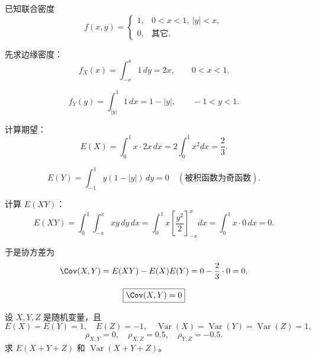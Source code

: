\begin{solution}
已知联合密度
\[
f(x,y)=
\begin{cases}
1, & 0<x<1,\ |y|<x,\\[3pt]
0, & \text{其它}.
\end{cases}
\]

先求边缘密度：
\[
f_X(x)=\int_{-x}^{x}1\,dy=2x,\qquad 0<x<1.
\]

\[
f_Y(y)=\int_{|y|}^{1}1\,dx=1-|y|,\qquad -1<y<1.
\]

计算期望：
\[
E(X)=\int_0^1 x\cdot 2x\,dx = 2\int_0^1 x^2 dx=\frac{2}{3}.
\]

\[
E(Y)=\int_{-1}^1 y(1-|y|)\,dy = 0 \quad (\text{被积函数为奇函数}).
\]

计算 $E(XY)$：
\[
E(XY)=\int_0^1\int_{-x}^{x}xy\,dy\,dx
=\int_0^1 x\left[\frac{y^2}{2}\right]_{-x}^{x}dx
=\int_0^1 x\cdot 0\,dx = 0.
\]

于是协方差为
\[
\Cov(X,Y)=E(XY)-E(X)E(Y)=0-\frac{2}{3}\cdot 0=0.
\]

\[
\boxed{\Cov(X,Y)=0}
\]
\end{solution}
\begin{homework}[3.32]
设 $X, Y, Z$ 是随机变量，且
\[
E(X) = E(Y) = 1,\quad E(Z) = -1,\quad \operatorname{Var}(X) = \operatorname{Var}(Y) = \operatorname{Var}(Z) = 1,
\]
\[
\rho_{X,Y} = 0,\quad \rho_{X,Z} = 0.5,\quad \rho_{Y,Z} = -0.5.
\]
求 $E(X + Y + Z)$ 和 $\operatorname{Var}(X + Y + Z)$。
\end{homework}

